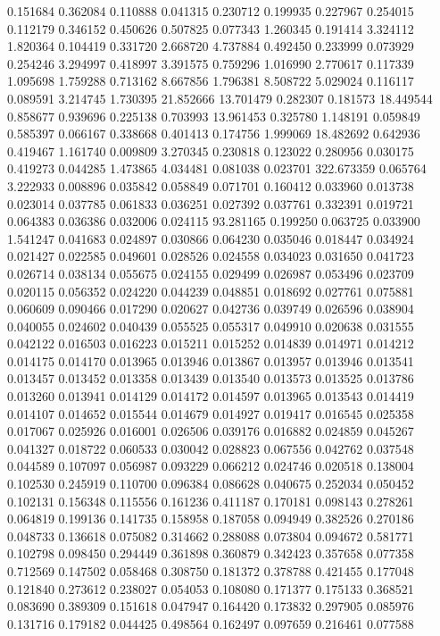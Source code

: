 0.151684
0.362084
0.110888
0.041315
0.230712
0.199935
0.227967
0.254015
0.112179
0.346152
0.450626
0.507825
0.077343
1.260345
0.191414
3.324112
1.820364
0.104419
0.331720
2.668720
4.737884
0.492450
0.233999
0.073929
0.254246
3.294997
0.418997
3.391575
0.759296
1.016990
2.770617
0.117339
1.095698
1.759288
0.713162
8.667856
1.796381
8.508722
5.029024
0.116117
0.089591
3.214745
1.730395
21.852666
13.701479
0.282307
0.181573
18.449544
0.858677
0.939696
0.225138
0.703993
13.961453
0.325780
1.148191
0.059849
0.585397
0.066167
0.338668
0.401413
0.174756
1.999069
18.482692
0.642936
0.419467
1.161740
0.009809
3.270345
0.230818
0.123022
0.280956
0.030175
0.419273
0.044285
1.473865
4.034481
0.081038
0.023701
322.673359
0.065764
3.222933
0.008896
0.035842
0.058849
0.071701
0.160412
0.033960
0.013738
0.023014
0.037785
0.061833
0.036251
0.027392
0.037761
0.332391
0.019721
0.064383
0.036386
0.032006
0.024115
93.281165
0.199250
0.063725
0.033900
1.541247
0.041683
0.024897
0.030866
0.064230
0.035046
0.018447
0.034924
0.021427
0.022585
0.049601
0.028526
0.024558
0.034023
0.031650
0.041723
0.026714
0.038134
0.055675
0.024155
0.029499
0.026987
0.053496
0.023709
0.020115
0.056352
0.024220
0.044239
0.048851
0.018692
0.027761
0.075881
0.060609
0.090466
0.017290
0.020627
0.042736
0.039749
0.026596
0.038904
0.040055
0.024602
0.040439
0.055525
0.055317
0.049910
0.020638
0.031555
0.042122
0.016503
0.016223
0.015211
0.015252
0.014839
0.014971
0.014212
0.014175
0.014170
0.013965
0.013946
0.013867
0.013957
0.013946
0.013541
0.013457
0.013452
0.013358
0.013439
0.013540
0.013573
0.013525
0.013786
0.013260
0.013941
0.014129
0.014172
0.014597
0.013965
0.013543
0.014419
0.014107
0.014652
0.015544
0.014679
0.014927
0.019417
0.016545
0.025358
0.017067
0.025926
0.016001
0.026506
0.039176
0.016882
0.024859
0.045267
0.041327
0.018722
0.060533
0.030042
0.028823
0.067556
0.042762
0.037548
0.044589
0.107097
0.056987
0.093229
0.066212
0.024746
0.020518
0.138004
0.102530
0.245919
0.110700
0.096384
0.086628
0.040675
0.252034
0.050452
0.102131
0.156348
0.115556
0.161236
0.411187
0.170181
0.098143
0.278261
0.064819
0.199136
0.141735
0.158958
0.187058
0.094949
0.382526
0.270186
0.048733
0.136618
0.075082
0.314662
0.288088
0.073804
0.094672
0.581771
0.102798
0.098450
0.294449
0.361898
0.360879
0.342423
0.357658
0.077358
0.712569
0.147502
0.058468
0.308750
0.181372
0.378788
0.421455
0.177048
0.121840
0.273612
0.238027
0.054053
0.108080
0.171377
0.175133
0.368521
0.083690
0.389309
0.151618
0.047947
0.164420
0.173832
0.297905
0.085976
0.131716
0.179182
0.044425
0.498564
0.162497
0.097659
0.216461
0.077588
